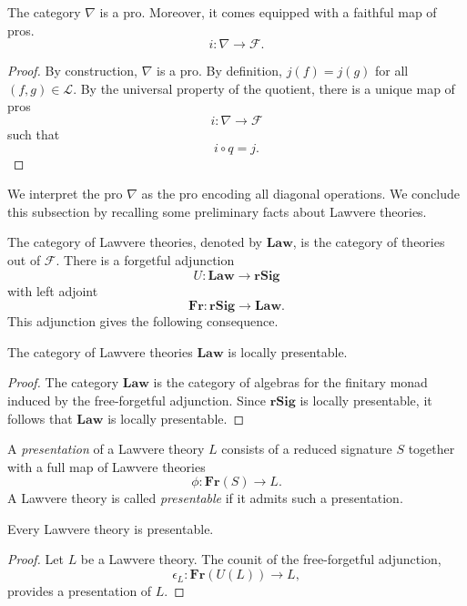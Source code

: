 \documentclass{tac}
\begin{document}
\begin{lemma}\label{constr_of_nabla}
The category $\nabla$ is a pro.  Moreover, it comes equipped with a faithful map of pros.
\[
i:\nabla\to\mathcal{F}.
\]
\end{lemma}

\begin{proof}
By construction, $\nabla$ is a pro. By definition, $j(f)=j(g)$ for all $(f,g)\in\mathcal{L}$. By the universal property of the quotient, there is a unique map of pros 
\[
i:\nabla\to\mathcal{F}
\]
such that
\[
i\circ q=j.
\]
\end{proof}

We interpret the pro $\nabla$ as the pro encoding all diagonal operations. We conclude this subsection by recalling some preliminary facts about Lawvere theories.

The category of Lawvere theories, denoted by $\mathbf{Law}$, is the category of theories out of $\mathcal{F}$. There is a forgetful adjunction
\[
U:\mathbf{Law}\to\mathbf{rSig}
\]
with left adjoint
\[
\mathbf{Fr}:\mathbf{rSig}\to\mathbf{Law}.
\]
This adjunction gives the following consequence.

\begin{lemma}
The category of Lawvere theories $\mathbf{Law}$ is locally presentable.
\end{lemma}

\begin{proof}
The category $\mathbf{Law}$ is the category of algebras for the finitary monad induced by the free-forgetful adjunction. Since $\mathbf{rSig}$ is locally presentable, it follows that $\mathbf{Law}$ is locally presentable.
\end{proof}

\begin{definition}\label{def_of_present}
A \emph{presentation} of a Lawvere theory $L$ consists of a reduced signature $S$ together with a full map of Lawvere theories
\[
\phi:\mathbf{Fr}(S)\to L.
\]
A Lawvere theory is called \emph{presentable} if it admits such a presentation.
\end{definition}

\begin{lemma}\label{Law_th_are_presentable}
Every Lawvere theory is presentable.
\end{lemma}

\begin{proof}
Let $L$ be a Lawvere theory. The counit of the free-forgetful adjunction,
\[
\epsilon_L:\mathbf{Fr}(U(L))\to L,
\]
provides a presentation of $L$.
\end{proof}
\end{document}
